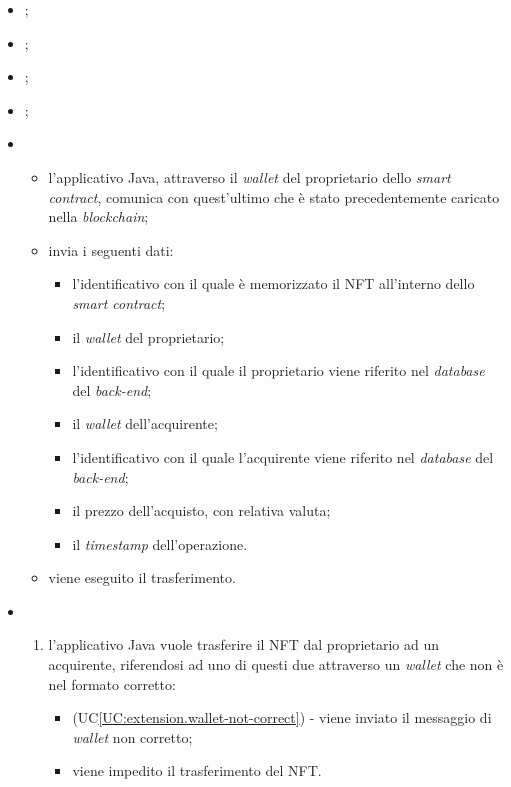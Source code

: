 \begin{itemize}
  \item {};
  \item {};
  \item {};
  \item {};
  
  \item \UCMain
  \begin{itemize}
    \item l'applicativo Java, attraverso il \textit{wallet} del proprietario dello \textit{smart contract}, comunica con quest'ultimo che è stato precedentemente caricato nella \textit{blockchain};
    \item invia i seguenti dati:
    \begin{itemize}
      \item l'identificativo con il quale è memorizzato il NFT all'interno dello \textit{smart contract};
      \item il \textit{wallet} del proprietario;
      \item l'identificativo con il quale il proprietario viene riferito nel \textit{database} del \textit{back-end};
      \item il \textit{wallet} dell'acquirente;
      \item l'identificativo con il quale l'acquirente viene riferito nel \textit{database} del \textit{back-end};
      \item il prezzo dell'acquisto, con relativa valuta;
      \item il \textit{timestamp} dell'operazione.
    \end{itemize}
    \item viene eseguito il trasferimento.
  \end{itemize}

  \item \UCExt
  \begin{enumerate}[label=\lett]
    \item l'applicativo Java vuole trasferire il NFT dal proprietario ad un acquirente, riferendosi ad uno di questi due attraverso un \textit{wallet} che non è nel formato corretto:
    \begin{itemize}
      \item (UC\ref{UC:extension.wallet-not-correct}) - viene inviato il messaggio di \textit{wallet} non corretto;
      \item viene impedito il trasferimento del NFT.
    \end{itemize}


\end{enumerate}
\end{itemize}
